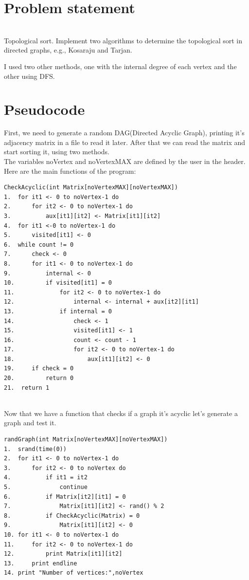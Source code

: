 \documentclass[14pt]{article}
\begin{document}
\section*{Problem statement}
\\\vspace{5 mm}
Topological sort. Implement two algorithms to determine the topological sort in
directed graphs, e.g., Kosaraju and Tarjan.
\begin{center}
\end{center}
I used two other methods, one with the internal degree of each vertex and the other using DFS.


\newpage
\section*{Pseudocode}
First, we need to generate a random DAG(Directed Acyclic Graph), printing it's adjacency matrix in a file to read it later. After that we can read the matrix and start sorting it, using two methods.
\\
The variables noVertex and noVertexMAX are defined by the user in the header.
\\
Here are the main functions of the program:
\begin{lstlisting}
CheckAcyclic(int Matrix[noVertexMAX][noVertexMAX])
1.  for it1 <- 0 to noVertex-1 do
2.      for it2 <- 0 to noVertex-1 do
3.          aux[it1][it2] <- Matrix[it1][it2]
4.  for it1 <-0 to noVertex-1 do
5.	    visited[it1] <- 0
6.  while count != 0
7.      check <- 0
8.      for it1 <- 0 to noVertex-1 do
9.          internal <- 0
10.         if visited[it1] = 0
11.             for it2 <- 0 to noVertex-1 do
12.                 internal <- internal + aux[it2][it1]
13.             if internal = 0
14.                 check <- 1
15.                 visited[it1] <- 1
16.                 count <- count - 1
17.                 for it2 <- 0 to noVertex-1 do
18.                     aux[it1][it2] <- 0
19.     if check = 0  
20.         return 0
21.  return 1
\end{lstlisting}
\\Now that we have a function that checks if a graph it's acyclic let's generate a graph and test it.
\begin{lstlisting}
randGraph(int Matrix[noVertexMAX][noVertexMAX])
1.  srand(time(0))
2.  for it1 <- 0 to noVertex-1 do
3.      for it2 <- 0 to noVertex do
4.          if it1 = it2
5.              continue
6.          if Matrix[it2][it1] = 0  
7.              Matrix[it1][it2] <- rand() % 2
8.          if CheckAcyclic(Matrix) = 0
9.              Matrix[it1][it2] <- 0
10. for it1 <- 0 to noVertex-1 do
11.     for it2 <- 0 to noVertex-1 do
12.         print Matrix[it1][it2]
13.     print endline
14. print "Number of vertices:",noVertex
\end{lstlisting}
\end{document}
